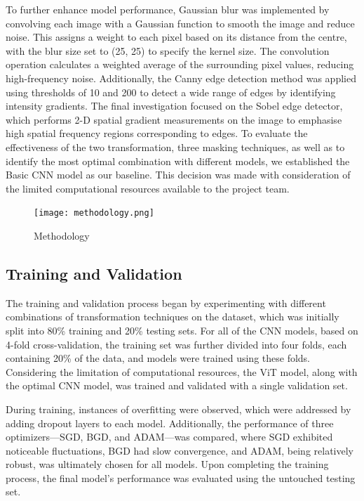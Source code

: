 \documentclass[letterpaper,9pt,twocolumn,twoside,]{pinp}
\begin{document}
To further enhance model performance, Gaussian blur was implemented by
convolving each image with a Gaussian function to smooth the image and
reduce noise. This assigns a weight to each pixel based on its distance
from the centre, with the blur size set to (25, 25) to specify the
kernel size. The convolution operation calculates a weighted average of
the surrounding pixel values, reducing high-frequency noise.
Additionally, the Canny edge detection method was applied using
thresholds of 10 and 200 to detect a wide range of edges by identifying
intensity gradients. The final investigation focused on the Sobel edge
detector, which performs 2-D spatial gradient measurements on the image
to emphasise high spatial frequency regions corresponding to edges. To
evaluate the effectiveness of the two transformation, three masking
techniques, as well as to identify the most optimal combination with
different models, we established the Basic CNN model as our baseline.
This decision was made with consideration of the limited computational
resources available to the project team.

\begin{figure}[h]
    \raggedright
    \texttt{[image: methodology.png]}
    \caption{Methodology}
    \label{fig:methodology}
\end{figure}

\hypertarget{training-and-validation}{%
\subsection{Training and Validation}\label{training-and-validation}}

The training and validation process began by experimenting with
different combinations of transformation techniques on the dataset,
which was initially split into 80\% training and 20\% testing sets. For
all of the CNN models, based on 4-fold cross-validation, the training
set was further divided into four folds, each containing 20\% of the
data, and models were trained using these folds. Considering the
limitation of computational resources, the ViT model, along with the
optimal CNN model, was trained and validated with a single validation
set.

During training, instances of overfitting were observed, which were
addressed by adding dropout layers to each model. Additionally, the
performance of three optimizers---SGD, BGD, and ADAM---was compared,
where SGD exhibited noticeable fluctuations, BGD had slow convergence,
and ADAM, being relatively robust, was ultimately chosen for all models.
Upon completing the training process, the final model's performance was
evaluated using the untouched testing set.
\end{document}
